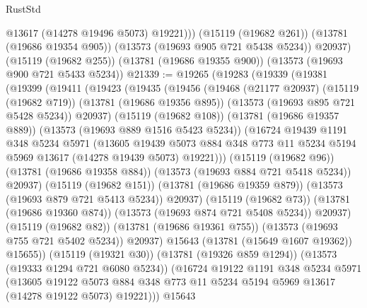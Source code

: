 \begin{lexlean}{RustStd}
\begin{coremodule}
            @13617
            (@14278 @19496 @5073)
            @19221)))
      (@15119 (@19682 @261))
      (@13781 (@19686 @19354 @905))
      (@13573 (@19693 @905 @721 @5438 @5234))
      @20937)
    (@15119 (@19682 @255))
    (@13781 (@19686 @19355 @900))
    (@13573 (@19693 @900 @721 @5433 @5234))
@21339 := @19265
    (@19283
      (@19339
        (@19381
          (@19399
            (@19411
              (@19423
                (@19435
                  (@19456
                    (@19468
                      (@21177 @20937)
                      (@15119 (@19682 @719))
                      (@13781 (@19686 @19356 @895))
                      (@13573 (@19693 @895 @721 @5428 @5234))
                      @20937)
                    (@15119 (@19682 @108))
                    (@13781 (@19686 @19357 @889))
                    (@13573 (@19693 @889 @1516 @5423 @5234))
                    (@16724
                      @19439
                      @1191
                      @348
                      @5234
                      @5971
                      (@13605
                        @19439
                        @5073
                        @884
                        @348
                        @773
                        @11
                        @5234
                        @5194
                        @5969
                        @13617
                        (@14278 @19439 @5073)
                        @19221)))
                  (@15119 (@19682 @96))
                  (@13781 (@19686 @19358 @884))
                  (@13573 (@19693 @884 @721 @5418 @5234))
                  @20937)
                (@15119 (@19682 @151))
                (@13781 (@19686 @19359 @879))
                (@13573 (@19693 @879 @721 @5413 @5234))
                @20937)
              (@15119 (@19682 @73))
              (@13781 (@19686 @19360 @874))
              (@13573 (@19693 @874 @721 @5408 @5234))
              @20937)
            (@15119 (@19682 @82))
            (@13781 (@19686 @19361 @755))
            (@13573 (@19693 @755 @721 @5402 @5234))
            @20937)
          @15643
          (@13781 (@15649 @1607 @19362))
          @15655))
      (@15119 (@19321 @30))
      (@13781 (@19326 @859 @1294))
      (@13573 (@19333 @1294 @721 @6080 @5234))
      (@16724
        @19122
        @1191
        @348
        @5234
        @5971
        (@13605
          @19122
          @5073
          @884
          @348
          @773
          @11
          @5234
          @5194
          @5969
          @13617
          (@14278 @19122 @5073)
          @19221)))
    @15643

\end{coremodule}
\end{lexlean}
